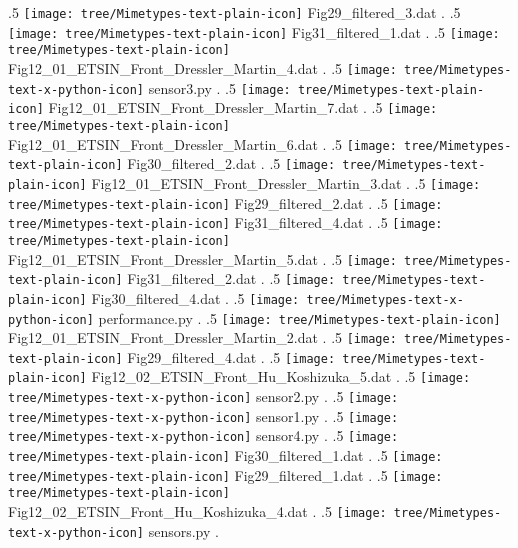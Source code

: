 {.5 { \texttt{[image: tree/Mimetypes-text-plain-icon]} Fig29\_filtered\_3.dat }.
.5 { \texttt{[image: tree/Mimetypes-text-plain-icon]} Fig31\_filtered\_1.dat }.
.5 { \texttt{[image: tree/Mimetypes-text-plain-icon]} Fig12\_01\_ETSIN\_Front\_Dressler\_Martin\_4.dat }.
.5 { \texttt{[image: tree/Mimetypes-text-x-python-icon]} sensor3.py }.
.5 { \texttt{[image: tree/Mimetypes-text-plain-icon]} Fig12\_01\_ETSIN\_Front\_Dressler\_Martin\_7.dat }.
.5 { \texttt{[image: tree/Mimetypes-text-plain-icon]} Fig12\_01\_ETSIN\_Front\_Dressler\_Martin\_6.dat }.
.5 { \texttt{[image: tree/Mimetypes-text-plain-icon]} Fig30\_filtered\_2.dat }.
.5 { \texttt{[image: tree/Mimetypes-text-plain-icon]} Fig12\_01\_ETSIN\_Front\_Dressler\_Martin\_3.dat }.
.5 { \texttt{[image: tree/Mimetypes-text-plain-icon]} Fig29\_filtered\_2.dat }.
.5 { \texttt{[image: tree/Mimetypes-text-plain-icon]} Fig31\_filtered\_4.dat }.
.5 { \texttt{[image: tree/Mimetypes-text-plain-icon]} Fig12\_01\_ETSIN\_Front\_Dressler\_Martin\_5.dat }.
.5 { \texttt{[image: tree/Mimetypes-text-plain-icon]} Fig31\_filtered\_2.dat }.
.5 { \texttt{[image: tree/Mimetypes-text-plain-icon]} Fig30\_filtered\_4.dat }.
.5 { \texttt{[image: tree/Mimetypes-text-x-python-icon]} performance.py }.
.5 { \texttt{[image: tree/Mimetypes-text-plain-icon]} Fig12\_01\_ETSIN\_Front\_Dressler\_Martin\_2.dat }.
.5 { \texttt{[image: tree/Mimetypes-text-plain-icon]} Fig29\_filtered\_4.dat }.
.5 { \texttt{[image: tree/Mimetypes-text-plain-icon]} Fig12\_02\_ETSIN\_Front\_Hu\_Koshizuka\_5.dat }.
.5 { \texttt{[image: tree/Mimetypes-text-x-python-icon]} sensor2.py }.
.5 { \texttt{[image: tree/Mimetypes-text-x-python-icon]} sensor1.py }.
.5 { \texttt{[image: tree/Mimetypes-text-x-python-icon]} sensor4.py }.
.5 { \texttt{[image: tree/Mimetypes-text-plain-icon]} Fig30\_filtered\_1.dat }.
.5 { \texttt{[image: tree/Mimetypes-text-plain-icon]} Fig29\_filtered\_1.dat }.
.5 { \texttt{[image: tree/Mimetypes-text-plain-icon]} Fig12\_02\_ETSIN\_Front\_Hu\_Koshizuka\_4.dat }.
.5 { \texttt{[image: tree/Mimetypes-text-x-python-icon]} sensors.py }.
}

